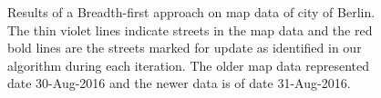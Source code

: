 \begin{figure}
\hspace{5mm}
\label{fg:bfsberlin}
\caption{Results of a Breadth-first approach on map data of city of Berlin. The thin violet lines indicate streets in the map data and the red bold lines are the streets marked for update as identified in our algorithm during each iteration. The older map data represented date 30-Aug-2016 and the newer data is of date 31-Aug-2016.}
\end{figure}



